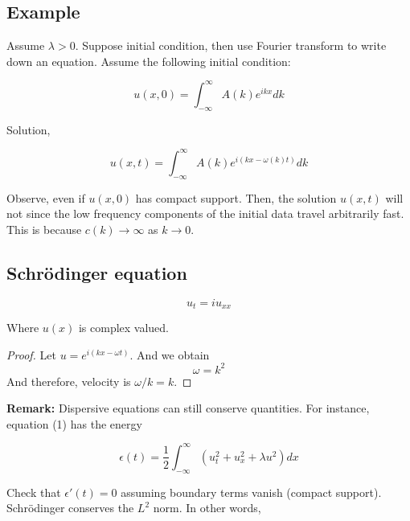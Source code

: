 \documentclass{article}
\newtheorem{one minute paper}[theorem]{One Minute Paper}
\begin{document}
\subsection*{Example}

Assume $\lambda > 0$. Suppose initial condition, then use Fourier transform to write down an equation. Assume the following initial condition:

\begin{equation}
    u(x,0) = \int_{-\infty}^{\infty}A(k)e^{ikx}dk
\end{equation}

Solution, 

\begin{equation}
    u(x,t) = \int_{-\infty}^{\infty}A(k)e^{i(kx - \omega(k) t)}dk
\end{equation}

Observe, even if $u(x,0)$ has compact support. Then, the solution $u(x,t)$ will not since the low frequency components of the initial 
data travel arbitrarily fast. This is because $c(k) \rightarrow \infty$ as $k \rightarrow 0$. 

\subsection*{Schr\"odinger equation}

\begin{equation}
    u_t = iu_{xx}
\end{equation}

Where $u(x)$ is complex valued. 

\begin{proof}
    Let $u= e^{i(kx-\omega t)}$. And we obtain 
    \begin{equation}
        \omega = k^2
    \end{equation}
    And therefore, velocity is $\omega/k = k$. 
\end{proof}

\textbf{Remark:} Dispersive equations can still conserve quantities. For instance, equation (1) has the energy 

\begin{equation}
    \epsilon(t) = \frac{1}{2}\int_{-\infty}^{\infty}\left( u_t^2 + u_x^2 + \lambda u^2 \right)dx
\end{equation}

Check that $\epsilon'(t) = 0$ assuming boundary terms vanish (compact support). Schr\"odinger conserves the $L^2$ norm. In other words, 
\end{document}
